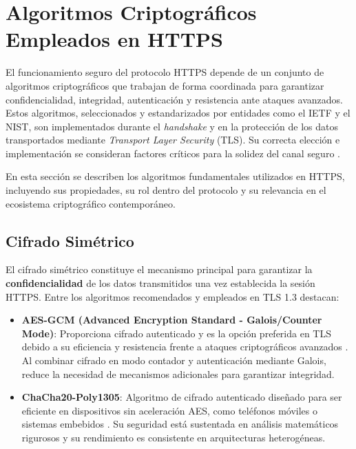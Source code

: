 \section{Algoritmos Criptográficos Empleados en HTTPS}

El funcionamiento seguro del protocolo HTTPS depende de un conjunto de algoritmos criptográficos que trabajan de forma coordinada para garantizar confidencialidad, integridad, autenticación y resistencia ante ataques avanzados. Estos algoritmos, seleccionados y estandarizados por entidades como el IETF y el NIST, son implementados durante el \textit{handshake} y en la protección de los datos transportados mediante \textit{Transport Layer Security} (TLS). Su correcta elección e implementación se consideran factores críticos para la solidez del canal seguro \cite{rfc8446, rfc7525}.

En esta sección se describen los algoritmos fundamentales utilizados en HTTPS, incluyendo sus propiedades, su rol dentro del protocolo y su relevancia en el ecosistema criptográfico contemporáneo.

\subsection{Cifrado Simétrico}

El cifrado simétrico constituye el mecanismo principal para garantizar la \textbf{confidencialidad} de los datos transmitidos una vez establecida la sesión HTTPS. Entre los algoritmos recomendados y empleados en TLS 1.3 destacan:

\begin{itemize}
    \item \textbf{AES-GCM (Advanced Encryption Standard - Galois/Counter Mode)}: Proporciona cifrado autenticado y es la opción preferida en TLS debido a su eficiencia y resistencia frente a ataques criptográficos avanzados \cite{rfc8446}. Al combinar cifrado en modo contador y autenticación mediante Galois, reduce la necesidad de mecanismos adicionales para garantizar integridad.
    
    \item \textbf{ChaCha20-Poly1305}: Algoritmo de cifrado autenticado diseñado para ser eficiente en dispositivos sin aceleración AES, como teléfonos móviles o sistemas embebidos \cite{krawczyk2016}. Su seguridad está sustentada en análisis matemáticos rigurosos y su rendimiento es consistente en arquitecturas heterogéneas.
\end{itemize}

